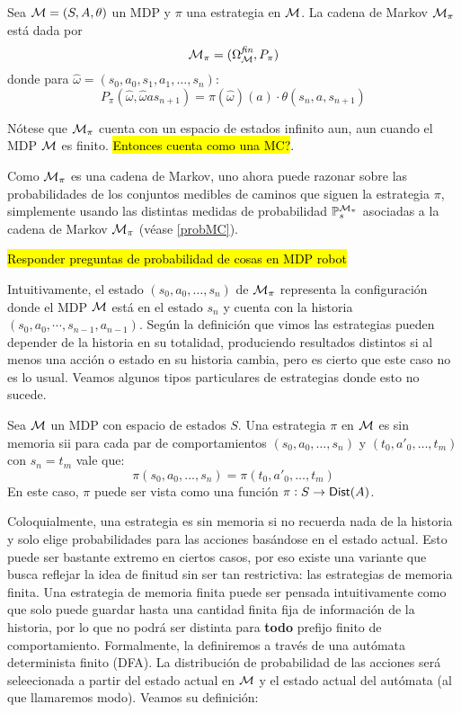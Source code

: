 \begin{definition}
	Sea $\mathcal{M} = (S, A, \theta)$ un MDP y $\pi$ una estrategia en $\mathcal{M}$. La cadena de Markov $\mathcal{M}_\pi$ está dada por
	$$\mathcal{M}_\pi = (\Omega^{\textit{fin}}_{\mathcal{M}}, P_\pi)$$
	donde para $\hat \omega = (s_0, a_0, s_1, a_1, \dots, s_n)$:
	$$P_\pi(\hat \omega, \hat \omega a s_{n+1}) = \pi(\hat \omega)(a) \cdot \theta(s_n, a, s_{n+1})$$
\end{definition}

Nótese que $\mathcal{M}_\pi$ cuenta con un espacio de estados infinito aun, aun cuando
el MDP $\mathcal{M}$ es finito. \hl{Entonces cuenta como una MC?}.

Como $\mathcal{M}_\pi$ es una cadena de Markov, uno ahora puede razonar sobre las
probabilidades de los conjuntos medibles de caminos que siguen la estrategia
$\pi$, simplemente usando las distintas medidas de probabilidad
$\mathbb{P}^{\mathcal{M}_\pi}_s$ asociadas a la cadena de Markov $\mathcal{M}_\pi$ (véase
\ref{probMC}).

\hl{Responder preguntas de probabilidad de cosas en MDP robot}

Intuitivamente, el estado $(s_0, a_0, \dots, s_n)$ de $\mathcal{M}_\pi$ representa la
configuración donde el MDP $\mathcal{M}$ está en el estado $s_n$ y cuenta con la
historia $(s_0, a_0, \cdots, s_{n-1}, a_{n-1})$. Según la definición que vimos
las estrategias pueden depender de la historia en su totalidad, produciendo
resultados distintos si al menos una acción o estado en su historia cambia,
pero es cierto que este caso no es lo usual. Veamos algunos tipos particulares
de estrategias donde esto no sucede.

\begin{definition}
	Sea $\mathcal{M}$ un MDP con espacio de estados $S$. Una estrategia $\pi$ en $\mathcal{M}$ es sin memoria sii para cada par de comportamientos $(s_0, a_0, \dots, s_n)$ y $(t_0, a'_0, \dots, t_m)$ con $s_n = t_m$ vale que:
	$$\pi(s_0, a_0, \dots, s_n) = \pi(t_0, a'_0, \dots, t_m)$$
	En este caso, $\pi$ puede ser vista como una función $\pi : S \rightarrow \mathsf{Dist}(A)$.
\end{definition}

Coloquialmente, una estrategia es sin memoria si no recuerda nada de la
historia y solo elige probabilidades para las acciones basándose en el estado
actual. Esto puede ser bastante extremo en ciertos casos, por eso existe una
variante que busca reflejar la idea de finitud sin ser tan restrictiva: las
estrategias de memoria finita. Una estrategia de memoria finita puede ser
pensada intuitivamente como que solo puede guardar hasta una cantidad finita
fija de información de la historia, por lo que no podrá ser distinta para
\textbf{todo} prefijo finito de comportamiento. Formalmente, la definiremos a
través de una autómata determinista finito (DFA). La distribución de
probabilidad de las acciones será seleecionada a partir del estado actual en
$\mathcal{M}$ y el estado actual del autómata (al que llamaremos modo). Veamos su
definición:

